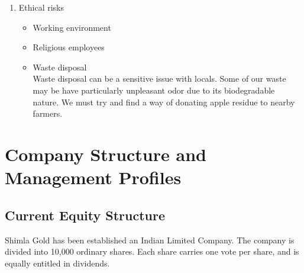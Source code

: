 \documentclass[11pt]{article}
\begin{document}
\begin{enumerate}
  \item Ethical risks
    \begin{itemize}
    \item Working environment
    \item Religious employees
    \item Waste disposal \\
Waste disposal can be a sensitive issue with locals. Some of our waste may be have particularly unpleasant odor due to its biodegradable nature. We must try and find a way of donating apple residue to nearby farmers.
    \end{itemize}
  \end{enumerate}

\newpage
\section{Company Structure and Management Profiles}

  \subsection{Current Equity Structure}
  Shimla Gold has been established an Indian Limited Company. The company is divided into 10,000 ordinary shares. Each share carries one vote per share, and is equally entitled in dividends.
\end{document}
